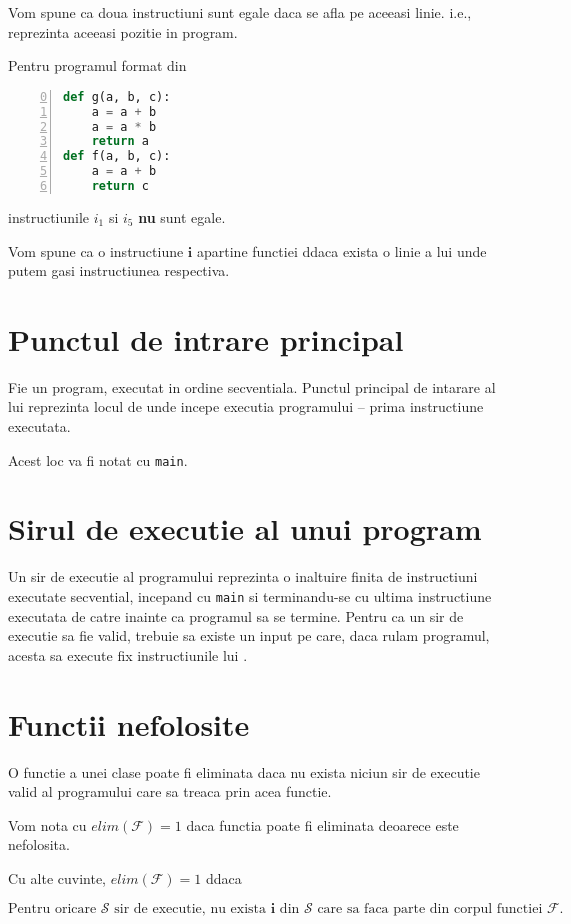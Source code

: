 Vom spune ca doua instructiuni sunt egale daca se afla pe aceeasi
linie. i.e., reprezinta aceeasi pozitie in program.

Pentru programul format din
\begin{lstlisting}[language=Python, numbers=left, firstnumber=0]
def g(a, b, c):
    a = a + b
    a = a * b
    return a
def f(a, b, c):
    a = a + b
    return c
\end{lstlisting}
instructiunile $i_1$ si $i_5$ \textbf{nu} sunt egale.

Vom spune ca o instructiune $\mathbf{i}$ apartine functiei
 ddaca exista o linie a lui  unde putem gasi
instructiunea respectiva.

\section{Punctul de intrare principal}

Fie  un program, executat in ordine secventiala.
Punctul principal de intarare al lui  reprezinta locul de
unde incepe executia programului -- prima instructiune executata.

Acest loc va fi notat cu \texttt{main}.

\section{Sirul de executie al unui program}

Un sir de executie  al programului  reprezinta o inaltuire
finita de instructiuni executate secvential, incepand cu
\texttt{main} si terminandu-se cu ultima instructiune executata de
catre  inainte ca programul sa se termine.
Pentru ca un sir de executie  sa fie valid, trebuie sa
existe un input pe care, daca rulam programul, acesta sa
execute fix instructiunile lui .

\section{Functii nefolosite}

O functie a unei clase poate fi eliminata daca nu exista niciun
sir de executie valid al programului care sa treaca prin acea
functie.

Vom nota cu $elim(\mathcal{F}) = 1$ daca functia  poate fi
eliminata deoarece este nefolosita.

Cu alte cuvinte, $elim(\mathcal{F}) = 1$ ddaca

\[
\text{Pentru oricare } \mathcal{S} \text{ sir de executie, nu
exista } \mathbf{i} \text{ din } \mathcal{S} \text { care sa faca
parte din corpul functiei } \mathcal{F}.
\]

